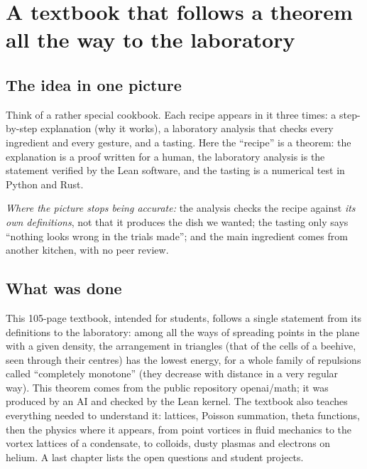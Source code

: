 \chapter[A textbook, one theorem]{A textbook that follows a theorem all the way to the laboratory}

\section*{The idea in one picture}

\begin{analogie}
Think of a rather special cookbook. Each recipe appears in it three times: a step-by-step explanation (why it
works), a laboratory analysis that checks every ingredient and every gesture, and a tasting. Here the ``recipe'' is
a theorem: the explanation is a proof written for a human, the laboratory analysis is the statement verified by the
Lean software, and the tasting is a numerical test in Python and Rust.

\emph{Where the picture stops being accurate:} the analysis checks the recipe against \emph{its own definitions},
not that it produces the dish we wanted; the tasting only says ``nothing looks wrong in the trials made''; and the
main ingredient comes from another kitchen, with no peer review.
\end{analogie}

\section*{What was done}

This 105-page textbook, intended for students, follows a single statement from its definitions to the laboratory:
among all the ways of spreading points in the plane with a given density, the arrangement in triangles (that of the
cells of a beehive, seen through their centres) has the lowest energy, for a whole family of repulsions called
``completely monotone'' (they decrease with distance in a very regular way). This theorem comes from the public
repository openai/math; it was produced by an AI and checked by the Lean kernel. The textbook also teaches everything
needed to understand it: lattices, Poisson summation, theta functions, then the physics where it appears, from
point vortices in fluid mechanics to the vortex lattices of a condensate, to colloids, dusty plasmas and electrons
on helium. A last chapter lists the open questions and student projects.

